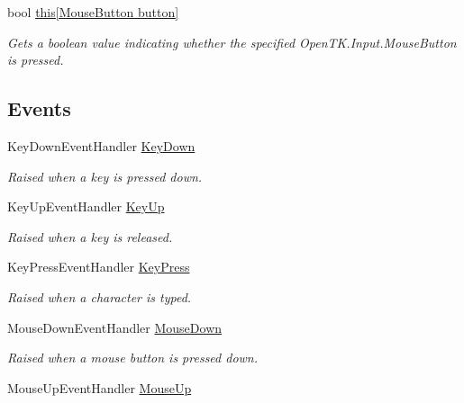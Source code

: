 \begin{DoxyCompactItemize}
bool \hyperlink{interface_tri_devs_1_1_tri_engine_1_1_input_1_1_i_input_manager_ad35176c53bff7945cfb07a801f5d67c5}{this\mbox{[}\-Mouse\-Button button\mbox{]}}
\begin{DoxyCompactList}\small\item\em Gets a boolean value indicating whether the specified Open\-T\-K.\-Input.\-Mouse\-Button is pressed. \end{DoxyCompactList}\end{DoxyCompactItemize}
\subsection*{Events}
\begin{DoxyCompactItemize}
\item 
Key\-Down\-Event\-Handler \hyperlink{interface_tri_devs_1_1_tri_engine_1_1_input_1_1_i_input_manager_a99f5fc3c551b90a6195354eb10107fae}{Key\-Down}
\begin{DoxyCompactList}\small\item\em Raised when a key is pressed down. \end{DoxyCompactList}\item 
Key\-Up\-Event\-Handler \hyperlink{interface_tri_devs_1_1_tri_engine_1_1_input_1_1_i_input_manager_aca30e6a6a1501d773f75084a1352b088}{Key\-Up}
\begin{DoxyCompactList}\small\item\em Raised when a key is released. \end{DoxyCompactList}\item 
Key\-Press\-Event\-Handler \hyperlink{interface_tri_devs_1_1_tri_engine_1_1_input_1_1_i_input_manager_a33baf0fdb394f0a409e8e8ac4b422240}{Key\-Press}
\begin{DoxyCompactList}\small\item\em Raised when a character is typed. \end{DoxyCompactList}\item 
Mouse\-Down\-Event\-Handler \hyperlink{interface_tri_devs_1_1_tri_engine_1_1_input_1_1_i_input_manager_a8bcb1b59f102c4132543ed1b07b6124c}{Mouse\-Down}
\begin{DoxyCompactList}\small\item\em Raised when a mouse button is pressed down. \end{DoxyCompactList}\item 
Mouse\-Up\-Event\-Handler \hyperlink{interface_tri_devs_1_1_tri_engine_1_1_input_1_1_i_input_manager_a7802c9f62acf5509a7486198229c7a27}{Mouse\-Up}

\end{DoxyCompactItemize}
